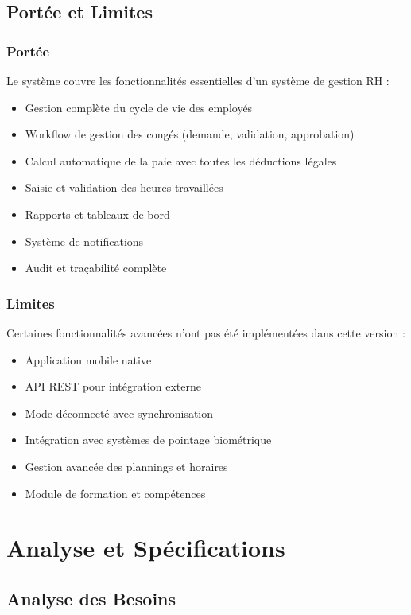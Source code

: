 \documentclass[12pt,a4paper,twoside]{report}
\begin{document}
\section{Portée et Limites}

\subsection{Portée}
Le système couvre les fonctionnalités essentielles d'un système de gestion RH :
\begin{itemize}
    \item Gestion complète du cycle de vie des employés
    \item Workflow de gestion des congés (demande, validation, approbation)
    \item Calcul automatique de la paie avec toutes les déductions légales
    \item Saisie et validation des heures travaillées
    \item Rapports et tableaux de bord
    \item Système de notifications
    \item Audit et traçabilité complète
\end{itemize}

\subsection{Limites}
Certaines fonctionnalités avancées n'ont pas été implémentées dans cette version :
\begin{itemize}
    \item Application mobile native
    \item API REST pour intégration externe
    \item Mode déconnecté avec synchronisation
    \item Intégration avec systèmes de pointage biométrique
    \item Gestion avancée des plannings et horaires
    \item Module de formation et compétences
\end{itemize}

\chapter{Analyse et Spécifications}

\section{Analyse des Besoins}
\end{document}
